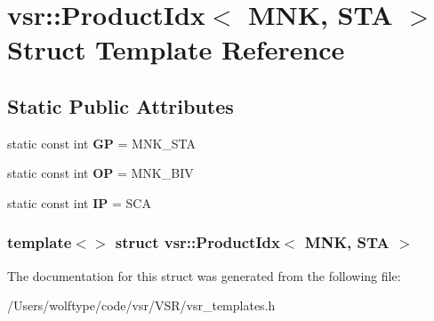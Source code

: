 \hypertarget{structvsr_1_1_product_idx_3_01_m_n_k_00_01_s_t_a_01_4}{\section{vsr\-:\-:Product\-Idx$<$ M\-N\-K, S\-T\-A $>$ Struct Template Reference}
\label{structvsr_1_1_product_idx_3_01_m_n_k_00_01_s_t_a_01_4}
}
\subsection*{Static Public Attributes}
\begin{DoxyCompactItemize}
\item 
\hypertarget{structvsr_1_1_product_idx_3_01_m_n_k_00_01_s_t_a_01_4_a0eee31fd14f397b3d36584a86ae7fc67}{static const int {\bfseries G\-P} = M\-N\-K\-\_\-\-S\-T\-A}\label{structvsr_1_1_product_idx_3_01_m_n_k_00_01_s_t_a_01_4_a0eee31fd14f397b3d36584a86ae7fc67}

\item 
\hypertarget{structvsr_1_1_product_idx_3_01_m_n_k_00_01_s_t_a_01_4_ace4157441a432da98c672843999dc74a}{static const int {\bfseries O\-P} = M\-N\-K\-\_\-\-B\-I\-V}\label{structvsr_1_1_product_idx_3_01_m_n_k_00_01_s_t_a_01_4_ace4157441a432da98c672843999dc74a}

\item 
\hypertarget{structvsr_1_1_product_idx_3_01_m_n_k_00_01_s_t_a_01_4_a50526a17a40be37cc93eb48d28b7e78e}{static const int {\bfseries I\-P} = S\-C\-A}\label{structvsr_1_1_product_idx_3_01_m_n_k_00_01_s_t_a_01_4_a50526a17a40be37cc93eb48d28b7e78e}

\end{DoxyCompactItemize}
\subsubsection*{template$<$$>$ struct vsr\-::\-Product\-Idx$<$ M\-N\-K, S\-T\-A $>$}



The documentation for this struct was generated from the following file\-:\begin{DoxyCompactItemize}
\item 
/\-Users/wolftype/code/vsr/\-V\-S\-R/vsr\-\_\-templates.\-h\end{DoxyCompactItemize}
